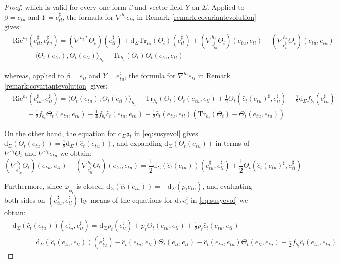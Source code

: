 \documentclass[10pt,reqno,a4paper]{amsart}
\theoremstyle{plain}
\theoremstyle{definition}
\theoremstyle{remark}
\theoremstyle{remark}
\def\dd{\mathrm{d}}
\newcommand{\Tr}{\mathrm{Tr}}
\def\fra{\mathfrak{a}}
\newcommand{\Ric}{\mathrm{Ric}}
\renewcommand{\(}{ (}
\renewcommand{\)}{ )}
\begin{document}
\begin{proof}
\noindent
which is valid for every one-form $\beta$ and vector field $Y$ on $\Sigma$. Applied to $\beta = e_{tu}$ and $Y = e^{\sharp}_{tl}$, the formula for $\nabla^{h_t}e_{tu}$ in Remark \ref{remark:covariantevolution} gives:
\begin{eqnarray*}
& \Ric^{h_t}(e^{\sharp}_{tl},e^{\sharp}_{tu}) = (\nabla^{h_t\ast}\Theta_t)(e^{\sharp}_{tl}) + \dd_{\Sigma}\Tr_{h_t}(\Theta_t)(e^{\sharp}_{tl}) + (\nabla^{h_t}_{e^{\sharp}_{tu}}\Theta_t)(e_{tu},e_{tl}) - (\nabla^{h_t}_{e^{\sharp}_{tl}}\Theta_t)(e_{tu},e_{tu}) \\
& \qquad + \langle \Theta_t(e_{tu}),\Theta_t(e_{tl})\rangle_{h_t} - \Tr_{h_t}(\Theta_t)\Theta_t(e_{tu},e_{tl})
\end{eqnarray*}

\noindent
whereas, applied to $\beta = e_{tl}$ and $Y = e^{\sharp}_{tu}$, the formula for $\nabla^{h_t}e_{tl}$ in Remark \ref{remark:covariantevolution} gives:
\begin{eqnarray*}
& \Ric^{h_t}(e^{\sharp}_{tu},e^{\sharp}_{tl}) = \langle \Theta_t(e_{tu}),\Theta_t(e_{tl})\rangle_{h_t} - \Tr_{h_t}(\Theta_t)\Theta_t(e_{tu},e_{tl}) + \frac{1}{2}\Theta_t(\widehat{c}_t (e_{tu})^{\sharp},e^{\sharp}_{tl}) - \frac{1}{2}\dd_{\Sigma} f_{b_t}(e^{\sharp}_{tn}) \\
& \qquad - \frac{1}{2} f_{b_t}\Theta_t(e_{tn},e_{tu}) - \frac{1}{4} f_{b_t}\widehat{c}_t (e_{tu},e_{tn}) - \frac{1}{2}\widehat{c}_t (e_{tu},e_{tl}) (\Tr_{h_t}(\Theta_t) - \Theta_t(e_{tu},e_{tu}) )
\end{eqnarray*}

\noindent
On the other hand, the equation for $\dd_{\Sigma}\fra_t$ in \eqref{eq:susyevol} gives $\dd_{\Sigma}(\Theta_t(e_{tu})) = \frac{1}{2}\dd_{\Sigma}(\widehat{c}_t (e_{tu}))$, and expanding $\dd_{\Sigma}(\Theta_t(e_{tu}))$ in terms of $\nabla^{h_t}\Theta_t$ and $\nabla^{h_t}e_{tu}$ we obtain:
\begin{equation*}
(\nabla^{h_t}_{e^{\sharp}_{tu}}\Theta_t)(e_{tu},e_{tl}) - (\nabla^{h_t}_{e^{\sharp}_{tl}}\Theta_t)(e_{tu},e_{tu}) = \frac{1}{2}\dd_{\Sigma}(\widehat{c}_t (e_{tu}))(e^{\sharp}_{tu},e^{\sharp}_{tl}) + \frac{1}{2}\Theta_t(\widehat{c}_t (e_{tu})^{\sharp},e^{\sharp}_{tl})
\end{equation*}

\noindent
Furthermore, since $\varphi_{\phi_t}$ is closed, $\dd_{\Sigma}(\widehat{c}_t (e_{tu})) = - \dd_{\Sigma}(p_t e_{tu})$, and evaluating both sides on $(e^{\sharp}_{tu},e^{\sharp}_{tl})$ by means of the equations for $\dd_{\Sigma} e^t_i$ in \eqref{eq:susyevol} we obtain:
\begin{eqnarray*}
& \dd_{\Sigma}(\widehat{c}_t (e_{tu}))(e^{\sharp}_{tu},e^{\sharp}_{tl}) = \dd_{\Sigma}p_t(e^{\sharp}_{tl}) + p_t\Theta_t(e_{tu},e_{tl}) + \frac{1}{2}p_t \widehat{c}_t (e_{tu},e_{tl}) \\
& \qquad = \dd_{\Sigma}(\widehat{c}_t (e_{tu},e_{tl}))(e^{\sharp}_{tu}) - \widehat{c}_t (e_{tu},e_{tl})\Theta_t(e_{tl},e_{tl}) - \widehat{c}_t (e_{tu},e_{tn})\Theta_t(e_{tl},e_{tn}) + \frac{1}{2} f_{b_t}\widehat{c}_t (e_{tu},e_{tn})
\end{eqnarray*}


\end{proof}
\end{document}
